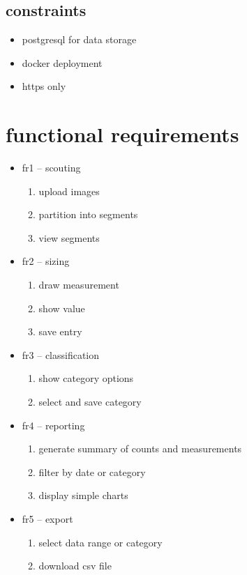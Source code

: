 \documentclass{article}
\begin{document}
\subsection{constraints}
\begin{itemize}
  \item postgresql for data storage
  \item docker deployment
  \item https only
\end{itemize}

\section{functional requirements}
\begin{itemize}
  \item fr1 – scouting
    \begin{enumerate}
      \item upload images
      \item partition into segments
      \item view segments
    \end{enumerate}
  \item fr2 – sizing
    \begin{enumerate}
      \item draw measurement
      \item show value
      \item save entry
    \end{enumerate}
  \item fr3 – classification
    \begin{enumerate}
      \item show category options
      \item select and save category
    \end{enumerate}
  \item fr4 – reporting
    \begin{enumerate}
      \item generate summary of counts and measurements
      \item filter by date or category
      \item display simple charts
    \end{enumerate}
  \item fr5 – export
    \begin{enumerate}
      \item select data range or category
      \item download csv file
    \end{enumerate}
\end{itemize}
\end{document}
